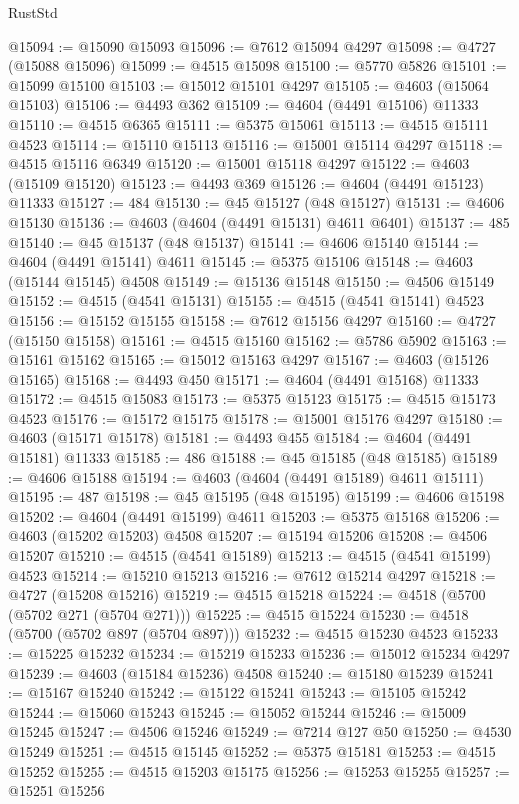 \begin{lexlean}{RustStd}
\begin{coremodule}
@15094 := @15090 @15093
@15096 := @7612 @15094 @4297
@15098 := @4727 (@15088 @15096)
@15099 := @4515 @15098
@15100 := @5770 @5826
@15101 := @15099 @15100
@15103 := @15012 @15101 @4297
@15105 := @4603 (@15064 @15103)
@15106 := @4493 @362
@15109 := @4604 (@4491 @15106) @11333
@15110 := @4515 @6365
@15111 := @5375 @15061
@15113 := @4515 @15111 @4523
@15114 := @15110 @15113
@15116 := @15001 @15114 @4297
@15118 := @4515 @15116 @6349
@15120 := @15001 @15118 @4297
@15122 := @4603 (@15109 @15120)
@15123 := @4493 @369
@15126 := @4604 (@4491 @15123) @11333
@15127 := 484
@15130 := @45 @15127 (@48 @15127)
@15131 := @4606 @15130
@15136 := @4603 (@4604 (@4491 @15131) @4611 @6401)
@15137 := 485
@15140 := @45 @15137 (@48 @15137)
@15141 := @4606 @15140
@15144 := @4604 (@4491 @15141) @4611
@15145 := @5375 @15106
@15148 := @4603 (@15144 @15145) @4508
@15149 := @15136 @15148
@15150 := @4506 @15149
@15152 := @4515 (@4541 @15131)
@15155 := @4515 (@4541 @15141) @4523
@15156 := @15152 @15155
@15158 := @7612 @15156 @4297
@15160 := @4727 (@15150 @15158)
@15161 := @4515 @15160
@15162 := @5786 @5902
@15163 := @15161 @15162
@15165 := @15012 @15163 @4297
@15167 := @4603 (@15126 @15165)
@15168 := @4493 @450
@15171 := @4604 (@4491 @15168) @11333
@15172 := @4515 @15083
@15173 := @5375 @15123
@15175 := @4515 @15173 @4523
@15176 := @15172 @15175
@15178 := @15001 @15176 @4297
@15180 := @4603 (@15171 @15178)
@15181 := @4493 @455
@15184 := @4604 (@4491 @15181) @11333
@15185 := 486
@15188 := @45 @15185 (@48 @15185)
@15189 := @4606 @15188
@15194 := @4603 (@4604 (@4491 @15189) @4611 @15111)
@15195 := 487
@15198 := @45 @15195 (@48 @15195)
@15199 := @4606 @15198
@15202 := @4604 (@4491 @15199) @4611
@15203 := @5375 @15168
@15206 := @4603 (@15202 @15203) @4508
@15207 := @15194 @15206
@15208 := @4506 @15207
@15210 := @4515 (@4541 @15189)
@15213 := @4515 (@4541 @15199) @4523
@15214 := @15210 @15213
@15216 := @7612 @15214 @4297
@15218 := @4727 (@15208 @15216)
@15219 := @4515 @15218
@15224 := @4518 (@5700 (@5702 @271 (@5704 @271)))
@15225 := @4515 @15224
@15230 := @4518 (@5700 (@5702 @897 (@5704 @897)))
@15232 := @4515 @15230 @4523
@15233 := @15225 @15232
@15234 := @15219 @15233
@15236 := @15012 @15234 @4297
@15239 := @4603 (@15184 @15236) @4508
@15240 := @15180 @15239
@15241 := @15167 @15240
@15242 := @15122 @15241
@15243 := @15105 @15242
@15244 := @15060 @15243
@15245 := @15052 @15244
@15246 := @15009 @15245
@15247 := @4506 @15246
@15249 := @7214 @127 @50
@15250 := @4530 @15249
@15251 := @4515 @15145
@15252 := @5375 @15181
@15253 := @4515 @15252
@15255 := @4515 @15203 @15175
@15256 := @15253 @15255
@15257 := @15251 @15256

\end{coremodule}
\end{lexlean}
